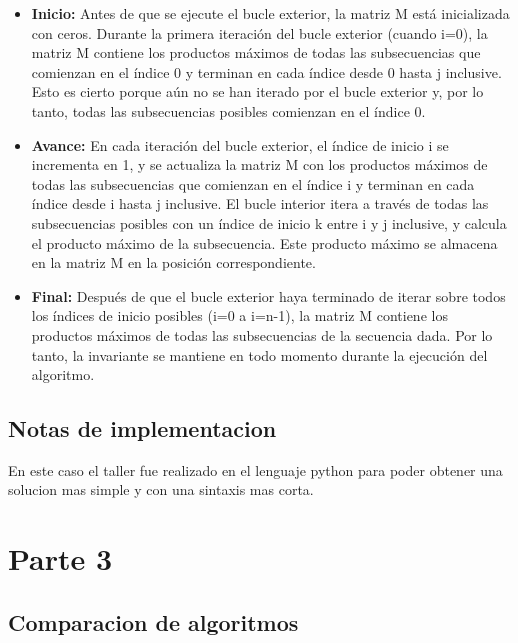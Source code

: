 \documentclass[11pt]{article}
\begin{document}
\begin{itemize}
\item
  \textbf{Inicio:} Antes de que se ejecute el bucle exterior, la matriz
  M está inicializada con ceros. Durante la primera iteración del bucle
  exterior (cuando i=0), la matriz M contiene los productos máximos de
  todas las subsecuencias que comienzan en el índice 0 y terminan en
  cada índice desde 0 hasta j inclusive. Esto es cierto porque aún no se
  han iterado por el bucle exterior y, por lo tanto, todas las
  subsecuencias posibles comienzan en el índice 0.
\item
  \textbf{Avance:} En cada iteración del bucle exterior, el índice de
  inicio i se incrementa en 1, y se actualiza la matriz M con los
  productos máximos de todas las subsecuencias que comienzan en el
  índice i y terminan en cada índice desde i hasta j inclusive. El bucle
  interior itera a través de todas las subsecuencias posibles con un
  índice de inicio k entre i y j inclusive, y calcula el producto máximo
  de la subsecuencia. Este producto máximo se almacena en la matriz M en
  la posición correspondiente.
\item
  \textbf{Final:} Después de que el bucle exterior haya terminado de
  iterar sobre todos los índices de inicio posibles (i=0 a i=n-1), la
  matriz M contiene los productos máximos de todas las subsecuencias de
  la secuencia dada. Por lo tanto, la invariante se mantiene en todo
  momento durante la ejecución del algoritmo.
\end{itemize}

\hypertarget{notas-de-implementacion}{%
\subsection{Notas de implementacion}\label{notas-de-implementacion}}

En este caso el taller fue realizado en el lenguaje python para poder
obtener una solucion mas simple y con una sintaxis mas corta.

\pagebreak
\hypertarget{parte-3}{%
\section{Parte 3}\label{parte-3}}

\hypertarget{comparacion-de-algoritmos}{%
\subsection{Comparacion de
algoritmos}\label{comparacion-de-algoritmos}}
\end{document}
